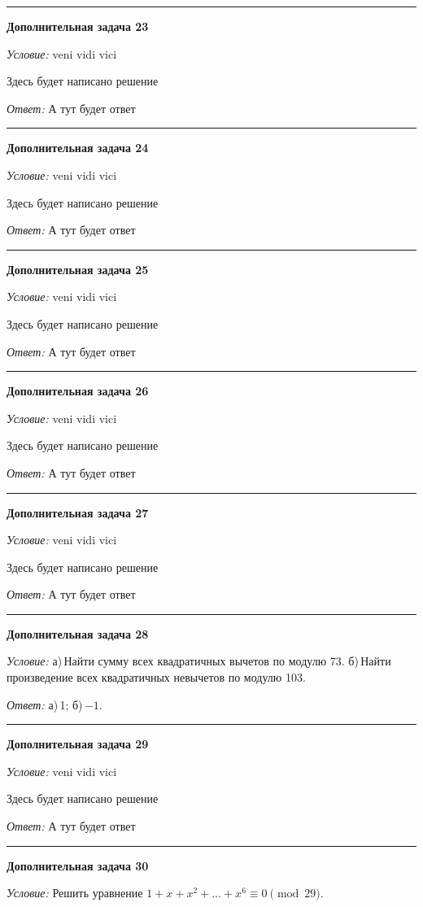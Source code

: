 \documentclass[12pt,a4paper]{article}
\newcommand{\sbs}{\large \bfseries}
\newcommand{\rl}{\vspace{16pt} \hrule \vspace{8pt}}
\begin{document}
\rl
{\sbs Дополнительная задача 23}

{\itshape Условие: } veni vidi vici

Здесь будет написано решение

{\itshape Ответ: } А тут будет ответ




\rl
{\sbs Дополнительная задача 24}

{\itshape Условие: } veni vidi vici

Здесь будет написано решение

{\itshape Ответ: } А тут будет ответ




\rl
{\sbs Дополнительная задача 25}

{\itshape Условие: } veni vidi vici

Здесь будет написано решение

{\itshape Ответ: } А тут будет ответ




\rl
{\sbs Дополнительная задача 26}

{\itshape Условие: } veni vidi vici

Здесь будет написано решение

{\itshape Ответ: } А тут будет ответ




\rl
{\sbs Дополнительная задача 27}

{\itshape Условие: } veni vidi vici

Здесь будет написано решение

{\itshape Ответ: } А тут будет ответ




\rl
{\sbs Дополнительная задача 28}

{\itshape Условие: } а)\,Найти сумму всех квадратичных вычетов по модулю 73. б)\,Найти произведение всех квадратичных невычетов по модулю 103.



{\itshape Ответ: } а)\,1; б)\,$-1$.




\rl
{\sbs Дополнительная задача 29}

{\itshape Условие: } veni vidi vici

Здесь будет написано решение

{\itshape Ответ: } А тут будет ответ




\rl
{\sbs Дополнительная задача 30}

{\itshape Условие: } Решить уравнение $1+x+x^2+\ldots+x^6\equiv 0\pmod{29}$.
\end{document}

